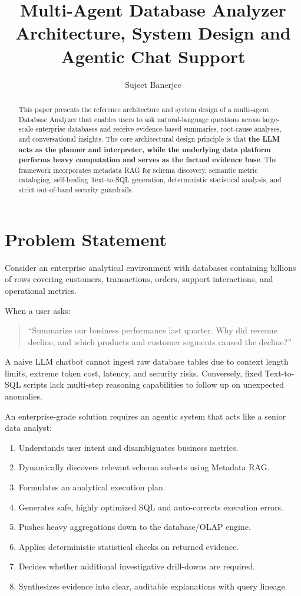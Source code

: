\documentclass[11pt,a4paper]{article}
\title{\textbf{Multi-Agent Database Analyzer}\\
\large Architecture, System Design and Agentic Chat Support}
\author{Sujeet Banerjee}
\date{}
\newcommand{\important}[1]{\textbf{#1}}
\begin{document}
\maketitle

\begin{abstract}
This paper presents the reference architecture and system design of a multi-agent Database Analyzer that enables users to ask natural-language questions across large-scale enterprise databases and receive evidence-based summaries, root-cause analyses, and conversational insights. The core architectural design principle is that \important{the LLM acts as the planner and interpreter, while the underlying data platform performs heavy computation and serves as the factual evidence base}. The framework incorporates metadata RAG for schema discovery, semantic metric cataloging, self-healing Text-to-SQL generation, deterministic statistical analysis, and strict out-of-band security guardrails.
\end{abstract}

\tableofcontents
\newpage

\section{Problem Statement}

Consider an enterprise analytical environment with databases containing billions of rows covering customers, transactions, orders, support interactions, and operational metrics.

When a user asks:
\begin{quote}
``Summarize our business performance last quarter. Why did revenue decline, and which products and customer segments caused the decline?''
\end{quote}

A naive LLM chatbot cannot ingest raw database tables due to context length limits, extreme token cost, latency, and security risks. Conversely, fixed Text-to-SQL scripts lack multi-step reasoning capabilities to follow up on unexpected anomalies.

An enterprise-grade solution requires an agentic system that acts like a senior data analyst:
\begin{enumerate}[leftmargin=*]
    \item Understands user intent and disambiguates business metrics.
    \item Dynamically discovers relevant schema subsets using Metadata RAG.
    \item Formulates an analytical execution plan.
    \item Generates safe, highly optimized SQL and auto-corrects execution errors.
    \item Pushes heavy aggregations down to the database/OLAP engine.
    \item Applies deterministic statistical checks on returned evidence.
    \item Decides whether additional investigative drill-downs are required.
    \item Synthesizes evidence into clear, auditable explanations with query lineage.
\end{enumerate}
\end{document}
